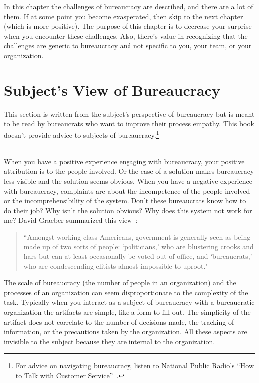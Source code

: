 In this chapter the challenges of bureaucracy are described, and there are a lot of them. If at some point you become exasperated, then skip to the next chapter (which is more positive). The purpose of this chapter is to decrease your surprise when you encounter these challenges. Also, there's value in recognizing that the challenges are generic to bureaucracy and not specific to you, your team, or your organization. 

\section{Subject's View of Bureaucracy\label{sec:subjects-view}}

This section is written from the subject's perspective of bureaucracy but is meant to be read by bureaucrats who want to improve their \gls{process empathy}. This book doesn't provide advice to subjects of bureaucracy.\footnote{For advice on navigating bureaucracy, listen to National Public Radio's \href{https://www.npr.org/2022/03/16/1086915600/get-what-you-want-customer-service}{``How to Talk with Customer Service''}~\cite{2022_LifeKit}.} 

\ \\

When you have a positive experience engaging with bureaucracy, your positive attribution is to the people involved. Or the ease of a solution makes bureaucracy less visible and the solution seems obvious. 
When you have a negative experience with bureaucracy, complaints are about the incompetence of the people involved or the incomprehensibility of the system. Don't these bureaucrats know how to do their job? Why isn't the solution obvious? Why does this system not work for me? David Graeber summarized this view~\cite{2015_Graeber_regulation}:
\begin{quote}
 ``Amongst working-class Americans, government is generally seen as being made up of two sorts of people: `politicians,' who are blustering crooks and liars but can at least occasionally be voted out of office, and `bureaucrats,' who are condescending elitists almost impossible to uproot."
\end{quote}



The scale of bureaucracy (the number of people in an organization) and the processes of an organization can seem disproportionate to the complexity of the task. Typically when you interact as a subject of bureaucracy with a bureaucratic organization the artifacts are simple, like a form to fill out. The simplicity of the artifact does not correlate to the number of decisions made, the tracking of information, or the precautions taken by the organization. All these aspects are invisible to the subject because they are internal to the organization.

